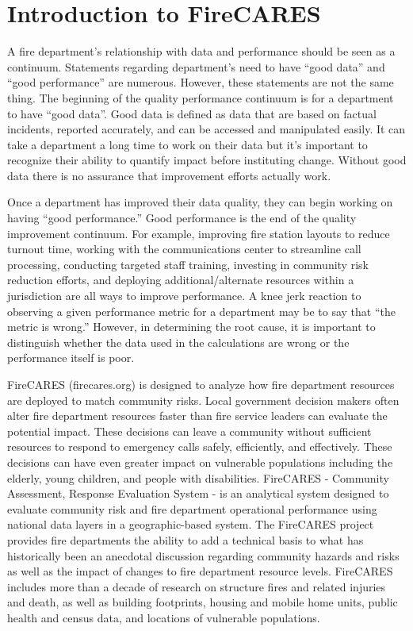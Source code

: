 \documentclass[12pt,oneside]{book}
\begin{document}
\newpage
\mainmatter

\chapter{Introduction to FireCARES}
A fire department's relationship with data and performance should be seen as a continuum. Statements regarding department's need to have ``good data'' and ``good performance'' are numerous. However, these statements are not the same thing. The beginning of the quality performance continuum is for a department to have ``good data''. Good data is defined as data that are based on factual incidents, reported accurately, and can be accessed and manipulated easily. It can take a department a long time to work on their data but it's important to recognize their ability to quantify impact before instituting change. Without good data there is no assurance that improvement efforts actually work.

Once a department has improved their data quality, they can begin working on having ``good performance.'' Good performance is the end of the quality improvement continuum. For example, improving fire station layouts to reduce turnout time, working with the communications center to streamline call processing, conducting targeted staff training, investing in community risk reduction efforts, and deploying additional/alternate resources within a jurisdiction are all ways to improve performance. 
A knee jerk reaction to observing a given performance metric for a department may be to say that ``the metric is wrong.'' However, in determining the root cause, it is important to distinguish whether the data used in the calculations are wrong or the performance itself is poor.  

FireCARES (firecares.org) is designed to analyze how fire department resources are deployed to match community risks. Local government decision makers often alter fire department resources faster than fire service leaders can evaluate the potential impact. These decisions can leave a community without sufficient resources to respond to emergency calls safely, efficiently, and effectively. These decisions can have even greater impact on vulnerable populations including the elderly, young children, and people with disabilities. FireCARES - Community Assessment, Response Evaluation System - is an analytical system designed to evaluate community risk and fire department operational performance using national data layers in a geographic-based system. The FireCARES project provides fire departments the ability to add a technical basis to what has historically been an anecdotal discussion regarding community hazards and risks as well as the impact of changes to fire department resource levels. FireCARES includes more than a decade of research on structure fires and related injuries and death, as well as building footprints, housing and mobile home units, public health and census data, and locations of vulnerable populations.
\end{document}
